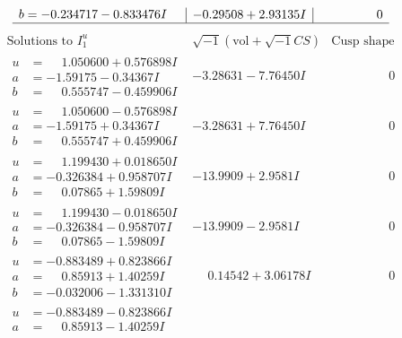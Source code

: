 \documentclass[1p]{elsarticle_modified}
\theoremstyle{definition}
\newcommand{\I}{\sqrt{-1}}
\begin{document}
$$\begin{array}{c|c|c}
\begin{aligned}
b &= -0.234717 - 0.833476 I\end{aligned}
 & -0.29508 + 2.93135 I & \phantom{-0.000000 } 0\\
 \hline 
 \end{array}$$\newpage$$\begin{array}{c|c|c}  
\text{Solutions to }I^u_{1}& \I (\text{vol} + \sqrt{-1}CS) & \text{Cusp shape}\\
 \hline 
\begin{aligned}
u &= \phantom{-}1.050600 + 0.576898 I \\
a &= -1.59175 - 0.34367 I \\
b &= \phantom{-}0.555747 - 0.459906 I\end{aligned}
 & -3.28631 - 7.76450 I & \phantom{-0.000000 } 0 \\ \hline\begin{aligned}
u &= \phantom{-}1.050600 - 0.576898 I \\
a &= -1.59175 + 0.34367 I \\
b &= \phantom{-}0.555747 + 0.459906 I\end{aligned}
 & -3.28631 + 7.76450 I & \phantom{-0.000000 } 0 \\ \hline\begin{aligned}
u &= \phantom{-}1.199430 + 0.018650 I \\
a &= -0.326384 + 0.958707 I \\
b &= \phantom{-}0.07865 + 1.59809 I\end{aligned}
 & -13.9909 + 2.9581 I & \phantom{-0.000000 } 0 \\ \hline\begin{aligned}
u &= \phantom{-}1.199430 - 0.018650 I \\
a &= -0.326384 - 0.958707 I \\
b &= \phantom{-}0.07865 - 1.59809 I\end{aligned}
 & -13.9909 - 2.9581 I & \phantom{-0.000000 } 0 \\ \hline\begin{aligned}
u &= -0.883489 + 0.823866 I \\
a &= \phantom{-}0.85913 + 1.40259 I \\
b &= -0.032006 - 1.331310 I\end{aligned}
 & \phantom{-}0.14542 + 3.06178 I & \phantom{-0.000000 } 0 \\ \hline\begin{aligned}
u &= -0.883489 - 0.823866 I \\
a &= \phantom{-}0.85913 - 1.40259 I \\

\end{aligned}
\end{array}$$
\end{document}
